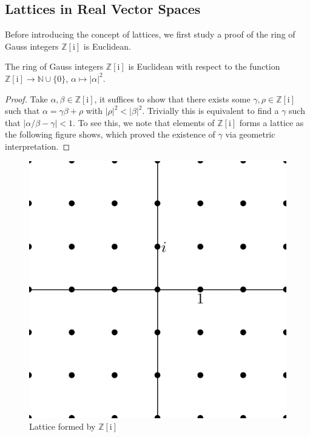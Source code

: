 \subsection{Lattices in Real Vector Spaces}
Before introducing the concept of lattices, we first study a proof of the ring of Gauss integers $\mathbb{Z}[\mathrm{i}]$ is Euclidean.
\begin{proposition}
The ring of Gauss integers $\mathbb{Z}[\mathrm{i}]$ is Euclidean with respect to the function $\mathbb{Z}[\mathrm{i}]\to\mathbb{N}\cup\{0\}$, $\alpha\mapsto|\alpha|^2$.
\end{proposition}
\begin{proof}
Take $\alpha,\beta\in\mathbb{Z}[\mathrm{i}]$, it suffices to show that there exists some $\gamma,\rho\in\mathbb{Z}[\mathrm{i}]$ such that $\alpha=\gamma\beta+\rho$ with $|\rho|^2<|\beta|^2$. Trivially this is equivalent to find a $\gamma$ such that $|\alpha/\beta-\gamma|<1$. To see this, we note that elements of $\mathbb{Z}[\mathrm{i}]$ forms a lattice as the following figure shows, which proved the existence of $\gamma$ via geometric interpretation.
\end{proof}
\begin{figure}[htbp]\label{Z[i]lattice}
    \center
    \includegraphics[scale=0.29]{Image/lattice-Z[i].png}
    \caption{Lattice formed by $\mathbb{Z}[\mathrm{i}]$}
\end{figure}
